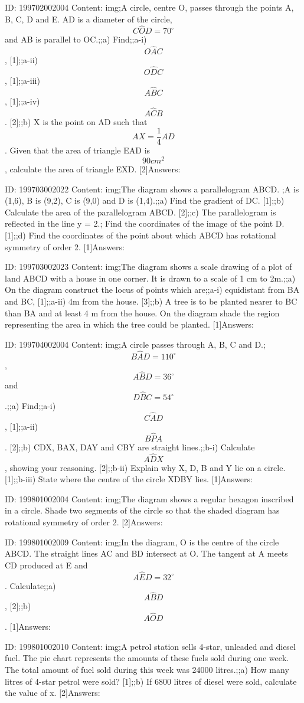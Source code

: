 \documentclass{article}
\begin{document}
ID: 199702002004
Content:
img;A circle, centre O, passes through the points A, B, C, D and E. AD is a diameter of the circle, $$C \hat OD=70^{\circ}$$ and AB is parallel to OC.;;a) Find;;a-i) $$O \hat AC$$, [1];;a-ii) $$O \hat DC$$, [1];;a-iii) $$A \hat BC$$, [1];;a-iv) $$A \hat CB$$. [2];;b) X is the point on AD such that $$AX=\frac{1}{4}AD$$. Given that the area of triangle EAD is $$90cm^2$$, calculate the area of triangle EXD. [2]Answers:

ID: 199703002022
Content:
img;The diagram shows a parallelogram ABCD. ;A is (1,6), B is (9,2), C is (9,0) and D is (1,4).;;a) Find the gradient of DC. [1];;b) Calculate the area of the parallelogram ABCD. [2];;c) The parallelogram is reflected in the line y = 2.; Find the coordinates of the image of the point D. [1];;d) Find the coordinates of the point about which ABCD has rotational symmetry of order 2. [1]Answers:

ID: 199703002023
Content:
img;The diagram shows a scale drawing of a plot of land ABCD with a house in one corner. It is drawn to a scale of 1 cm to 2m.;;a) On the diagram construct the locus of points which are;;a-i) equidistant from BA and BC,  [1];;a-ii) 4m from the house. [3];;b) A tree is to be planted nearer to BC than BA and at least 4 m from the house. On the diagram shade the region representing the area in which the tree could be planted. [1]Answers:

ID: 199704002004
Content:
img;A circle passes through A, B, C and D.; $$B \hat AD = 110^{\circ}$$, $$A \hat BD = 36^{\circ}$$ and $$D \hat BC = 54^{\circ}$$.;;a) Find;;a-i) $$C \hat AD$$,  [1];;a-ii) $$B \hat PA$$. [2];;b) CDX, BAX, DAY and CBY are straight lines.;;b-i) Calculate $$A \hat DX$$, showing your reasoning. [2];;b-ii) Explain why X, D, B and Y lie on a circle. [1];;b-iii) State where the centre of the circle XDBY lies. [1]Answers:

ID: 199801002004
Content:
img;The diagram shows a regular hexagon inscribed in a circle. Shade two segments of the circle so that the shaded diagram has rotational symmetry of order 2. [2]Answers:

ID: 199801002009
Content:
img;In the diagram, O is the centre of the circle ABCD. The straight lines AC and BD intersect at O. The tangent at A meets CD produced at E and $$A \hat ED=32^{\circ}$$. Calculate;;a) $$A \hat BD$$, [2];;b) $$A \hat OD$$. [1]Answers:

ID: 199801002010
Content:
img;A petrol station sells 4-star, unleaded and diesel fuel. The pie chart represents the amounts of these fuels sold during one week. The total amount of fuel sold during this week was 24000 litres.;;a) How many litres of 4-star petrol were sold? [1];;b) If 6800 litres of diesel were sold, calculate the value of x. [2]Answers:
\end{document}
